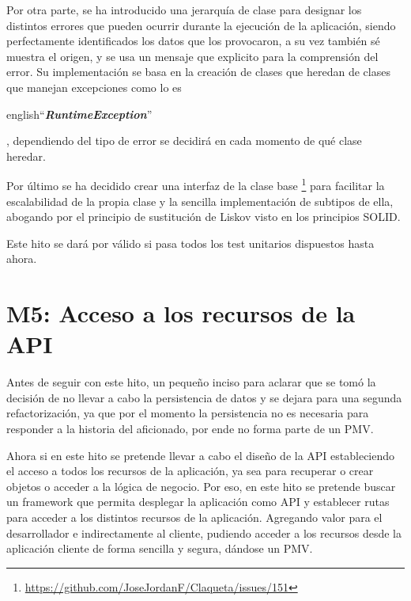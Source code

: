 Por otra parte, se ha introducido una jerarquía de clase para designar los distintos errores que pueden ocurrir
durante la ejecución de la aplicación, siendo perfectamente identificados los datos que los provocaron, a su vez 
también sé muestra el origen, y se usa un mensaje que explicito para la comprensión del error. Su implementación se 
basa en la creación de clases que heredan de clases que manejan excepciones como lo es 
\begin{otherlanguage} {english}``\textit{\textbf{RuntimeException}}''\end{otherlanguage}, 
dependiendo del tipo de error se decidirá en cada momento de qué clase heredar.

Por último se ha decidido crear una interfaz de la clase base \footnote{\url{https://github.com/JoseJordanF/Claqueta/issues/151}}
para facilitar la escalabilidad de la propia clase y la sencilla implementación de subtipos de ella, abogando por el 
principio de sustitución de Liskov visto en los principios SOLID.

Este hito se dará por válido si pasa todos los test unitarios dispuestos hasta ahora.

\section{M5: Acceso a los recursos de la API}

Antes de seguir con este hito, un pequeño inciso para aclarar que se tomó la decisión de no llevar a cabo la 
persistencia de datos y se dejara para una segunda refactorización, ya que por el momento la persistencia no es 
necesaria para responder a la historia del aficionado, por ende no forma parte de un PMV.

Ahora si en este hito se pretende llevar a cabo el diseño de la API estableciendo el  acceso a todos 
los recursos de la aplicación, ya sea para recuperar o crear objetos o acceder a la 
lógica de negocio. Por eso, en este hito se pretende buscar un framework que permita desplegar la aplicación como 
API y establecer rutas para acceder a los distintos recursos de la aplicación. Agregando valor para el
desarrollador e indirectamente al cliente, pudiendo acceder a los recursos desde la aplicación cliente de forma 
sencilla y segura, dándose un PMV.

